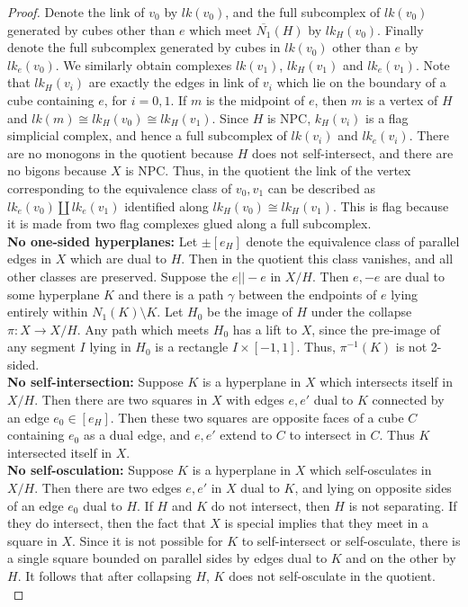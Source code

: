\documentclass[11pt]{amsart}
\numberwithin{thm}{section}
\theoremstyle{remark}
\theoremstyle{definition}
\newcommand{\overl}[1]{\overline{#1}}
\begin{document}
\begin{proof}
Denote the link of $v_0$ by $lk(v_0)$, and the full subcomplex of $lk(v_0)$ generated by cubes other than $e$ which meet $\overl{N_1}(H)$ by  $lk_H(v_0)$.  Finally denote the full subcomplex generated by cubes in $lk(v_0)$ other than $e$ by $lk_e(v_0)$.  We similarly obtain complexes $lk(v_1)$, $lk_H(v_1)$ and $lk_e(v_1)$. Note that $lk_H(v_i)$ are exactly the edges in link of $v_i$ which lie on the boundary of a cube containing $e$, for $i=0,1$.  If $m$ is the midpoint of $e$, then $m$ is a vertex of $H$ and $lk(m) \cong lk_H(v_0)\cong lk_H(v_1)$.  Since $H$ is NPC, $k_H(v_i)$ is a flag simplicial complex, and hence a full subcomplex of $lk(v_i)$ and $lk_e(v_i)$.  There are no monogons in the quotient because $H$ does not self-intersect, and there are no bigons because $X$ is NPC.  Thus, in the quotient the link of the vertex corresponding to the equivalence class of $v_0,v_1$ can be described as $lk_e(v_0)\coprod lk_e(v_1)$ identified along $lk_H(v_0)\cong lk_H(v_1)$.  This is flag because it is made from two flag complexes glued along a full subcomplex.\\

\noindent
\textbf{No one-sided hyperplanes:} Let $\pm [e_H]$ denote the equivalence class of parallel edges in $X$ which are dual to $H$.  Then in the quotient this class vanishes, and all other classes are preserved. Suppose the $e||-e$ in $X/H$.  Then $e,-e$ are dual to some hyperplane $K$ and there is a path $\gamma$ between the endpoints of $e$ lying entirely within $N_1(K)\setminus K$. Let $H_0$ be the image of $H$ under the collapse $\pi:X\rightarrow X/H$.  Any path which meets $H_0$ has a lift to $X$, since the pre-image of any segment $I$ lying in $H_0$ is a rectangle $I\times[-1,1]$.  Thus, $\pi^{-1}(K)$ is not 2-sided.  \\

\noindent
\textbf{No self-intersection:} Suppose $K$ is a hyperplane in $X$ which intersects itself in $X/H$. Then there are two squares in $X$ with edges $ e, e'$ dual to $K$ connected by an edge $e_0\in [e_H]$. Then these two squares are opposite faces of a cube $C$ containing $e_0$ as a dual edge, and $e,e'$ extend to $C$ to intersect in $C$.  Thus $K$ intersected itself in $X$.  \\

\noindent
\textbf{No self-osculation:} Suppose $K$ is a hyperplane in $X$ which self-osculates in $X/H$. Then there are two edges $e,e'$ in $X$ dual to $K$, and lying on opposite sides of an edge $e_0$ dual to $H$.  If $H$ and $K$ do not intersect, then $H$ is not separating.  If they do intersect, then the fact that $X$ is special implies that they meet in a square in $X$.  Since it is not possible for $K$ to self-intersect or self-osculate, there is a single square bounded on parallel sides by edges dual to $K$ and on the other by $H$.  It follows that after collapsing $H$, $K$ does not self-osculate in the quotient. \\


\end{proof}
\end{document}
